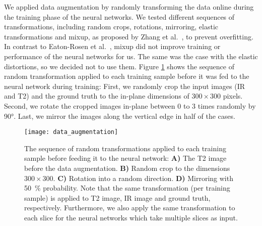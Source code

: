 We applied data augmentation by randomly transforming the data online during the training phase of the neural networks. We tested different sequences of transformations, including random crops, rotations, mirroring, elastic transformations and mixup, as proposed by Zhang et al.~\cite{Zhang2017Mixup:Minimization}, to prevent overfitting. In contrast to Eaton-Rosen et al.~\cite{Eaton-rosen2018ImprovingSegmentation}, mixup did not improve training or performance of the neural networks for us. The same was the case with the elastic distortions, so we decided not to use them. Figure \ref{fig:data_augmentation} shows the sequence of random transformation applied to each training sample before it was fed to the neural network during training: First, we randomly crop the input images (IR and T2) and the ground truth to the in-plane dimensions of $300 \times 300$ pixels. Second, we rotate the cropped images in-plane between 0 to 3 times randomly by 90\si{\degree}. Last, we mirror the images along the vertical edge in half of the cases.

\begin{figure}[htbp]	
	\texttt{[image: data\_augmentation]}
    \caption[Data Augmentation]{The sequence of random transformations applied to each training sample before feeding it to the neural network: \textbf{A)} The T2 image  before the data augmentation. \textbf{B)} Random crop to the dimensions $300 \times 300$. \textbf{C)} Rotation into a random direction. \textbf{D)} Mirroring with 50~\% probability. Note that the same transformation (per training sample) is applied to T2 image, IR image and ground truth, respectively. Furthermore, we also apply the same transformation to each slice for the neural networks which take multiple slices as input. }
    \label{fig:data_augmentation}
\end{figure}

